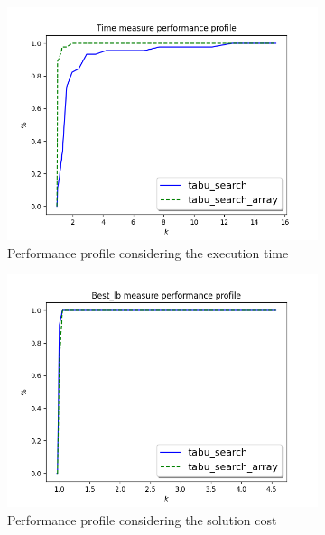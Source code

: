 \begin{figure}[!h]
	\centering
	\begin{subfigure}{0.49\columnwidth}
		\centering
		\includegraphics[width=\columnwidth]{../res/Ltabu_LA_time.png}
		\caption{Performance profile considering the execution time}
		\label{fig:tabu_search_diff_perform_time}
	\end{subfigure}
	\hfill
	\begin{subfigure}{0.49\columnwidth}
		\centering
		\includegraphics[width=\columnwidth]{../res/Ltabu_LA_lb.png}
		\caption{Performance profile considering the solution cost}
		\label{fig:tabu_search_diff_perform_lb}
	\end{subfigure}
\caption{}
\label{fig:tabu_search_diff_perform}
\end{figure}
